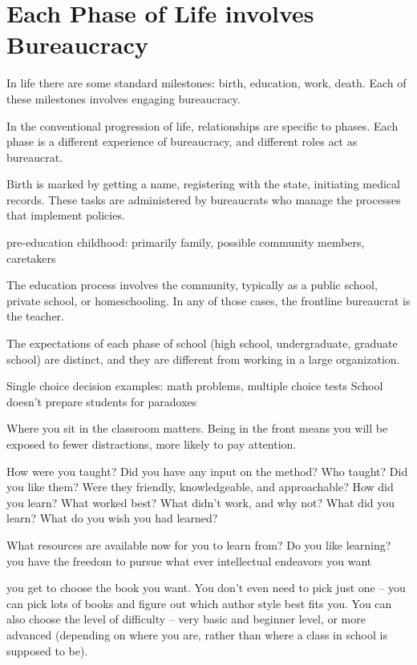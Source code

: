 \section{Each Phase of Life involves Bureaucracy}
In life there are some standard milestones: birth, education, work, death. Each of these milestones involves engaging bureaucracy. 

In the conventional progression of life, relationships are specific to phases. Each phase is a different experience of bureaucracy, and different roles act as bureaucrat. 


Birth is marked by getting a name, registering with the state, initiating medical records. These tasks are administered by bureaucrats who manage the processes that implement policies. 

pre-education childhood: primarily family, possible community members, caretakers


The education process involves the community, typically as a public school, private school, or homeschooling. In any of those cases, the frontline bureaucrat is the teacher. 


The expectations of each phase of school (high school, undergraduate, graduate school) are distinct, and they are different from working in a large organization. 

Single choice decision examples: math problems, multiple choice tests
School doesn't prepare students for paradoxes


Where you sit in the classroom matters. Being in the front means you will be exposed to fewer distractions, more likely to pay attention.


How were you taught? Did you have any input on the method?
Who taught? Did you like them? Were they friendly, knowledgeable, and approachable?
How did you learn? What worked best? What didn't work, and why not?
What did you learn? What do you wish you had learned?

What resources are available now for you to learn from? Do you like learning?
you have the freedom to pursue what ever intellectual endeavors you want

you get to choose the book you want. You don't even need to pick just one -- you can pick lots of books and figure out which author style best fits you. You can also choose the level of difficulty -- very basic and beginner level, or more advanced (depending on where you are, rather than where a class in school is supposed to be).

